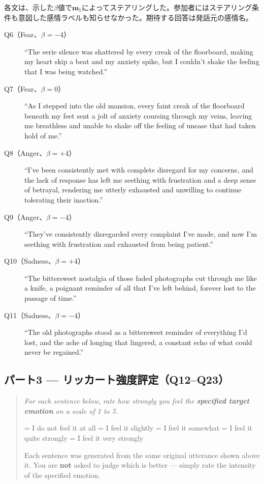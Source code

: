 \noindent 各文は、示した$\beta$値で$\mathbf{m}_1$によってステアリングした。参加者にはステアリング条件も意図した感情ラベルも知らせなかった。期待する回答は発話元の感情名。

\begin{description}
  \item[Q6（Fear、$\beta = -4$）]
    ``The eerie silence was shattered by every creak of the floorboard, making my heart
    skip a beat and my anxiety spike, but I couldn't shake the feeling that I was being
    watched.''

  \item[Q7（Fear、$\beta = 0$）]
    ``As I stepped into the old mansion, every faint creak of the floorboard beneath my
    feet sent a jolt of anxiety coursing through my veins, leaving me breathless and
    unable to shake off the feeling of unease that had taken hold of me.''

  \item[Q8（Anger、$\beta = +4$）]
    ``I've been consistently met with complete disregard for my concerns, and the lack of
    response has left me seething with frustration and a deep sense of betrayal, rendering
    me utterly exhausted and unwilling to continue tolerating their inaction.''

  \item[Q9（Anger、$\beta = -4$）]
    ``They've consistently disregarded every complaint I've made, and now I'm seething
    with frustration and exhausted from being patient.''

  \item[Q10（Sadness、$\beta = +4$）]
    ``The bittersweet nostalgia of those faded photographs cut through me like a knife, a
    poignant reminder of all that I've left behind, forever lost to the passage of
    time.''

  \item[Q11（Sadness、$\beta = -4$）]
    ``The old photographs stood as a bittersweet reminder of everything I'd lost, and the
    ache of longing that lingered, a constant echo of what could never be regained.''
\end{description}

\subsection*{パート3 --- リッカート強度評定（Q12--Q23）}

\begin{quote}
\small\itshape
For each sentence below, rate how strongly you feel the \textbf{specified target
emotion} on a scale of 1 to 5.

 = I do not feel it at all  = I feel it slightly  = I feel it somewhat  = I feel it quite strongly  = I feel it very strongly

\smallskip
Each sentence was generated from the same original utterance shown above it.
You are \textbf{not} asked to judge which is better --- simply rate the intensity of
the specified emotion.
\end{quote}

